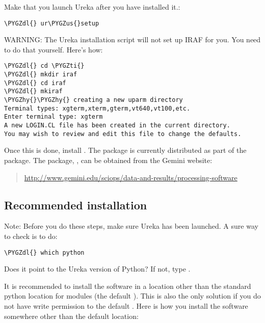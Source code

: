 \documentclass[letterpaper,10pt,english]{sphinxmanual}
\def\PYGZus{\char`\_}
\def\PYGZdl{\char`\$}
\def\PYGZhy{\char`\-}
\def\PYGZti{\char`\~}
\begin{document}
Make that you launch Ureka after you have installed it.:

\begin{Verbatim}[commandchars=\\\{\}]
\PYGZdl{} ur\PYGZus{}setup
\end{Verbatim}

WARNING:  The Ureka installation script will not set up IRAF for you. You need to do
that yourself. Here's how:

\begin{Verbatim}[commandchars=\\\{\}]
\PYGZdl{} cd \PYGZti{}
\PYGZdl{} mkdir iraf
\PYGZdl{} cd iraf
\PYGZdl{} mkiraf
\PYGZhy{}\PYGZhy{} creating a new uparm directory
Terminal types: xgterm,xterm,gterm,vt640,vt100,etc.
Enter terminal type: xgterm
A new LOGIN.CL file has been created in the current directory.
You may wish to review and edit this file to change the defaults.
\end{Verbatim}

Once this is done, install .  The  package is currently
distributed as part of the  package.  The  package,
, can be obtained from the Gemini website:
\begin{quote}

\href{http://www.gemini.edu/sciops/data-and-results/processing-software}{http://www.gemini.edu/sciops/data-and-results/processing-software}
\end{quote}


\subsection{Recommended installation}
\label{intro:recommended-installation}
Note:  Before you do these steps, make sure Ureka has been launched.  A sure way
to check is to do:

\begin{Verbatim}[commandchars=\\\{\}]
\PYGZdl{} which python
\end{Verbatim}

Does it point to the Ureka version of Python?  If not, type .

It is recommended to install the software in a location other than the standard python
location for modules (the default ). This is also the only solution if
you do not have write permission to the default .  Here is how you
install the software somewhere other than the default location:
\end{document}
